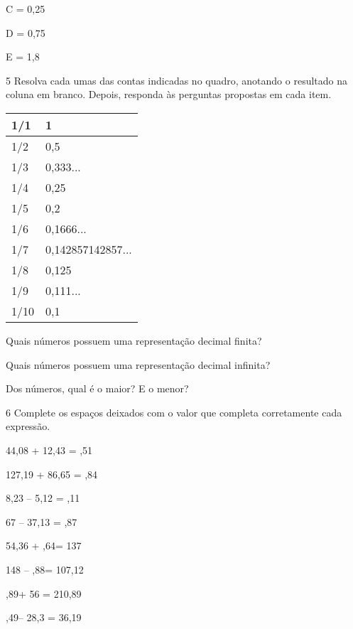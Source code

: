 {{C = 0,25

D = 0,75

E = 1,8}

\num{5} Resolva cada umas das contas indicadas no quadro, anotando o
resultado na coluna em branco. Depois, responda às perguntas propostas em cada item.

\begin{longtable}[]{@{}ll@{}}
\toprule
1/1 & 1\tabularnewline
\midrule
\endhead
1/2 & 0,5\tabularnewline
1/3 & 0,333...\tabularnewline
1/4 & 0,25\tabularnewline
1/5 & 0,2\tabularnewline
1/6 & 0,1666...\tabularnewline
1/7 & 0,142857142857...\tabularnewline
1/8 & 0,125\tabularnewline
1/9 & 0,111...\tabularnewline
1/10 & 0,1\tabularnewline
\bottomrule
\end{longtable}

\begin{escolha}
\item
  Quais números possuem uma representação decimal finita?


\item
  Quais números possuem uma representação decimal infinita?


\item
  Dos números, qual é o maior? E o menor?

\end{escolha}


\num{6} Complete os espaços deixados com o valor que completa corretamente cada expressão.

\begin{escolha}
\item
  44,08 + 12,43 = ,51\preencher
\item
  127,19 + 86,65 = ,84\preencher
\item
  8,23 -- 5,12 = ,11\preencher
\item
  67 -- 37,13 = ,87\preencher
\item
  54,36 + ,64\preencher = 137
\item
  148 -- ,88\preencher = 107,12
\item
  ,89\preencher + 56 = 210,89
\item
  ,49\preencher -- 28,3 = 36,19
\end{escolha}

}
